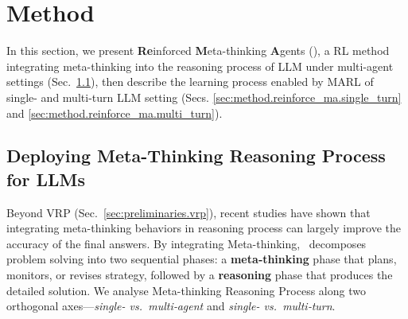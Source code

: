 
\section{Method}
\label{sec:method}
In this section, we present \textbf{Re}inforced \textbf{M}eta-thinking \textbf{A}gents (\method), a RL method integrating meta-thinking into the reasoning process of LLM under multi-agent settings (Sec.~\ref{sec:method.reinforce_ma.deploy_ma}), then describe the learning process enabled by MARL 
of single- and multi-turn LLM setting (Secs. \ref{sec:method.reinforce_ma.single_turn} and \ref{sec:method.reinforce_ma.multi_turn}).

\subsection{Deploying Meta-Thinking Reasoning Process for LLMs}
\label{sec:method.reinforce_ma.deploy_ma}

Beyond VRP (Sec.~\ref{sec:preliminaries.vrp}), recent studies \citep{muennighoff2025s1,ye2025limo} have shown that integrating meta-thinking behaviors in reasoning process can largely improve the accuracy of the final answers. 
By integrating Meta-thinking, \method~decomposes problem solving into two sequential phases: a \textbf{meta‑thinking} phase that plans, monitors, or revises strategy, followed by a \textbf{reasoning} phase that produces the detailed solution. 
We analyse Meta-thinking Reasoning Process along two orthogonal axes—\emph{single- vs.\ multi‑agent} and \emph{single- vs.\ multi‑turn}.

